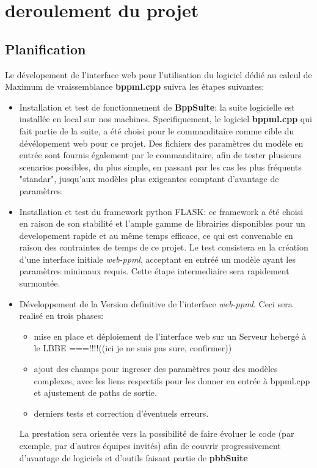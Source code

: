 \documentclass{article}
\begin{document}

\section{deroulement du projet} 

\subsection{Planification}

Le dévelopement de l'interface web pour l'utilisation du logiciel dédié au calcul de Maximum de vraissemblance \textbf{bppml.cpp} suivra les étapes suivantes:

\begin{itemize}
	\item Installation et test de fonctionnement de \textbf{BppSuite}: la suite logicielle est installée en local sur nos machines. Specifiquement, le logiciel \textbf{bppml.cpp} qui fait partie de la suite, a été choisi pour le commanditaire comme cible du dévélopement web pour ce projet. Des fichiers des paramètres du modèle en entrée sont fournis également par le commanditaire, afin de tester plusieurs scenarios possibles, du plus simple, en passant par les cas les plus fréquents "standar", jusqu'aux modèles plus exigeantes comptant d'avantage de paramètres.
	
	\item Installation et test du framework python FLASK: ce framework a été choisi 
	en raison de son stabilité et l'ample gamme de librairies disponibles pour un developement rapide et au même temps efficace, ce qui est convenable en raison des contraintes de temps de ce projet.
	Le test consistera en la création d'une interface initiale \textit{web-ppml}, acceptant en entréé un modèle ayant les paramètres minimaux requis. Cette étape intermediaire sera rapidement surmontée.
	
	\item Développement de la Version definitive de l'interface \textit{web-ppml}. Ceci sera realisé en trois phases:
	
	\begin{itemize}
		\item mise en place et déploiement de l'interface web sur un Serveur hebergé à le LBBE ===!!!!((ici je ne suis pas sure, confirmer))
		\item ajout des champs pour ingreser des paramètres pour des modèles complexes, avec les liens respectifs pour les donner en entrée à bppml.cpp et ajustement de paths de sortie.
		\item derniers tests et correction d'éventuels erreurs.
	\end{itemize}
	
	La prestation sera orientée vers la possibilité de faire évoluer le code (par exemple, par d'autres équipes invités) afin de couvrir progressivement d'avantage de logiciels et d'outils faisant partie de \textbf{pbbSuite}
\end{itemize}
\end{document}
